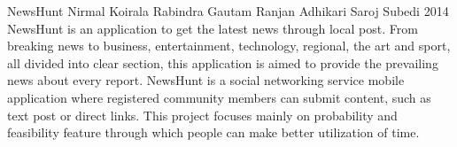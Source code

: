  \begin{conf-abstract}[]
{NewsHunt}
{Nirmal Koirala
Rabindra Gautam
Ranjan Adhikari
Saroj Subedi}
{2014}
NewsHunt is an application to get the latest news through local post. From breaking news to business, entertainment, technology, regional, the art and sport, all divided into clear section, this application is aimed to provide the prevailing news about every report. NewsHunt is a social networking service mobile application where registered community members can submit content, such as text post or direct links. This project focuses mainly on probability and feasibility feature through which people can make better utilization of time.
  \end{conf-abstract}
